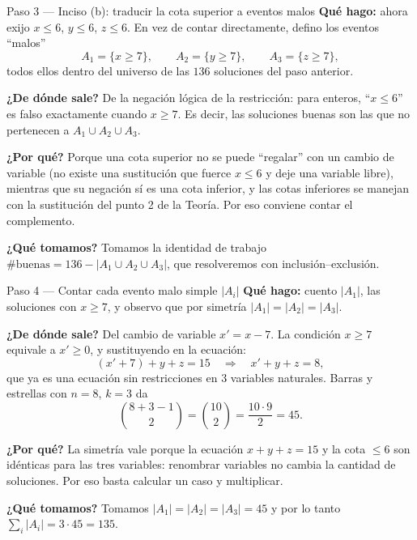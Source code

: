 \documentclass[11pt]{article}
\begin{document}
\begin{paso}{Paso 3 --- Inciso (b): traducir la cota superior a eventos malos}
\textbf{Qué hago:} ahora exijo $x\le 6$, $y\le 6$, $z\le 6$. En vez de contar directamente, defino los
eventos ``malos''
\[
A_1=\{x\ge 7\},\qquad A_2=\{y\ge 7\},\qquad A_3=\{z\ge 7\},
\]
todos ellos dentro del universo de las $136$ soluciones del paso anterior.

\textbf{¿De dónde sale?} De la negación lógica de la restricción: para enteros, ``$x\le 6$'' es falso
exactamente cuando $x\ge 7$. Es decir, las soluciones buenas son las que no pertenecen a
$A_1\cup A_2\cup A_3$.

\textbf{¿Por qué?} Porque una cota superior no se puede ``regalar'' con un cambio de variable (no
existe una sustitución que fuerce $x\le 6$ y deje una variable libre), mientras que su negación sí es
una cota inferior, y las cotas inferiores se manejan con la sustitución del punto 2 de la Teoría. Por
eso conviene contar el complemento.

\textbf{¿Qué tomamos?} Tomamos la identidad de trabajo
$\#\text{buenas}=136-|A_1\cup A_2\cup A_3|$, que resolveremos con inclusión--exclusión.
\end{paso}

\begin{paso}{Paso 4 --- Contar cada evento malo simple $|A_i|$}
\textbf{Qué hago:} cuento $|A_1|$, las soluciones con $x\ge 7$, y observo que por simetría
$|A_1|=|A_2|=|A_3|$.

\textbf{¿De dónde sale?} Del cambio de variable $x'=x-7$. La condición $x\ge 7$ equivale a $x'\ge 0$,
y sustituyendo en la ecuación:
\[
(x'+7)+y+z=15 \quad\Longrightarrow\quad x'+y+z=8,
\]
que ya es una ecuación sin restricciones en $3$ variables naturales. Barras y estrellas con $n=8$,
$k=3$ da
\[
\binom{8+3-1}{2}=\binom{10}{2}=\frac{10\cdot 9}{2}=45.
\]

\textbf{¿Por qué?} La simetría vale porque la ecuación $x+y+z=15$ y la cota $\le 6$ son idénticas para
las tres variables: renombrar variables no cambia la cantidad de soluciones. Por eso basta calcular
un caso y multiplicar.

\textbf{¿Qué tomamos?} Tomamos $|A_1|=|A_2|=|A_3|=45$ y por lo tanto
$\sum_i |A_i|=3\cdot 45=135$.
\end{paso}
\end{document}
